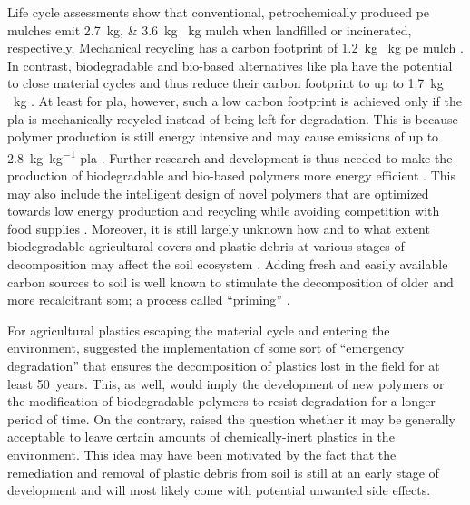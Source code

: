 Life cycle assessments show that conventional, petrochemically produced \ac{pe} mulches emit \SIlist{2.7;3.6}{\kilo\gram}  \si{\per\kilo\gram} mulch when landfilled or incinerated, respectively. Mechanical recycling has a carbon footprint of \SI{1.2}{\kilo\gram}  \si{\per\kilo\gram} \ac{pe} mulch \citep{BosLife2008}. In contrast, biodegradable and bio-based alternatives like \ac{pla} have the potential to close material cycles and thus reduce their carbon footprint to up to \SI{1.7}{\kilo\gram}  \si{\per\kilo\gram} \citep{KollerSwitching2019,RezvaniGhomiLife2021}. At least for \ac{pla}, however, such a low carbon footprint is achieved only if the \ac{pla} is mechanically recycled instead of being left for degradation. This is because polymer production is still energy intensive and may cause  emissions of up to \SI{2.8}{\kilo\gram\per\kilo\gram} \ac{pla} \citep{RezvaniGhomiLife2021,AltmanMyth2021}. Further research and development is thus needed to make the production of biodegradable and bio-based polymers more energy efficient \citep{VieraAre2021}. This may also include the intelligent design of novel polymers that are optimized towards low energy production and recycling \citep{VieraAre2021,KorleyPolymer2021,KakadellisAchieving2021} while avoiding competition with food supplies \citep{RhodesPlastic2018}. Moreover, it is still largely unknown how and to what extent biodegradable agricultural covers and plastic debris at various stages of decomposition may affect the soil ecosystem \citep{SanderBiodegradation2019,QinReview2021,AltmanMyth2021}. Adding fresh and easily available carbon sources to soil is well known to stimulate the decomposition of older and more recalcitrant \ac{som}; a process called ``priming'' \citep{ChenMixing2020}.

For agricultural plastics escaping the material cycle and entering the environment, \citet{BertlingKunststoffe2021} suggested the implementation of some sort of ``emergency degradation'' that ensures the decomposition of plastics lost in the field for at least \SI{50}{years}. This, as well, would imply the development of new polymers or the modification of biodegradable polymers to resist degradation for a longer period of time. On the contrary, \citet{ScalengheResource2018} raised the question whether it may be generally acceptable to leave certain amounts of chemically-inert plastics in the environment. This idea may have been motivated by the fact that the remediation and removal of plastic debris from soil is still at an early stage of development \citep{PadervandRemoval2020} and will most likely come with potential unwanted side effects.

